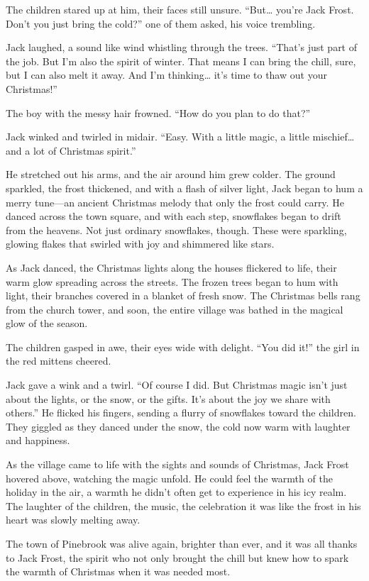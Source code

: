 \documentclass{article}
\begin{document}
The children stared up at him, their faces still unsure. “But… you’re Jack Frost. Don’t you just bring the cold?” one of them asked, his voice trembling.

Jack laughed, a sound like wind whistling through the trees. “That’s just part of the job. But I’m also the spirit of winter. That means I can bring the chill, sure, but I can also melt it away. And I’m thinking… it’s time to thaw out your Christmas!”

The boy with the messy hair frowned. “How do you plan to do that?”

Jack winked and twirled in midair. “Easy. With a little magic, a little mischief… and a lot of Christmas spirit.”

He stretched out his arms, and the air around him grew colder. The ground sparkled, the frost thickened, and with a flash of silver light, Jack began to hum a merry tune—an ancient Christmas melody that only the frost could carry. He danced across the town square, and with each step, snowflakes began to drift from the heavens. Not just ordinary snowflakes, though. These were sparkling, glowing flakes that swirled with joy and shimmered like stars.

As Jack danced, the Christmas lights along the houses flickered to life, their warm glow spreading across the streets. The frozen trees began to hum with light, their branches covered in a blanket of fresh snow. The Christmas bells rang from the church tower, and soon, the entire village was bathed in the magical glow of the season.

The children gasped in awe, their eyes wide with delight. “You did it!” the girl in the red mittens cheered.

Jack gave a wink and a twirl. “Of course I did. But Christmas magic isn’t just about the lights, or the snow, or the gifts. It’s about the joy we share with others.” He flicked his fingers, sending a flurry of snowflakes toward the children. They giggled as they danced under the snow, the cold now warm with laughter and happiness.

As the village came to life with the sights and sounds of Christmas, Jack Frost hovered above, watching the magic unfold. He could feel the warmth of the holiday in the air, a warmth he didn’t often get to experience in his icy realm. The laughter of the children, the music, the celebration it was like the frost in his heart was slowly melting away.

The town of Pinebrook was alive again, brighter than ever, and it was all thanks to Jack Frost, the spirit who not only brought the chill but knew how to spark the warmth of Christmas when it was needed most.
\end{document}
